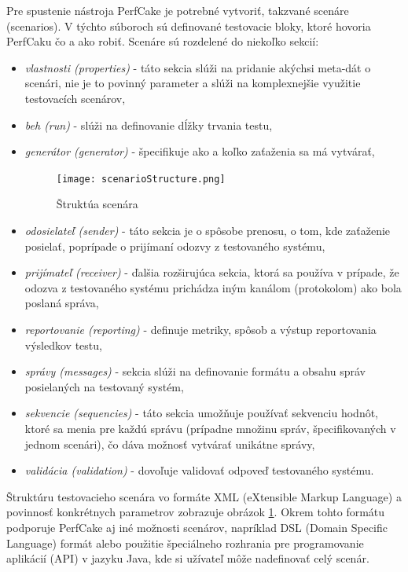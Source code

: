 Pre spustenie nástroja PerfCake je potrebné vytvoriť, takzvané scenáre (scenarios). V týchto súboroch sú definované testovacie bloky, ktoré hovoria PerfCaku čo a ako robiť. Scenáre sú rozdelené do niekoľko sekcií:
\begin{itemize}
\item \textit{vlastnosti (properties)} - táto sekcia slúži na pridanie akýchsi meta-dát o scenári, nie je to povinný parameter a slúži na komplexnejšie využitie testovacích scenárov,
\item \textit{beh (run)} - slúži na  definovanie dĺžky trvania testu,
\item \textit{generátor (generator)} - špecifikuje ako a koľko zaťaženia sa má vytvárať,
\begin{figure}[!ht]
\centering
\texttt{[image: scenarioStructure.png]} 
\caption{Štruktúa scenára}\label{scenarioStructure}
\end{figure}
\item \textit{odosielateľ (sender)} - táto sekcia je o spôsobe prenosu, o tom, kde zaťaženie posielať, poprípade o prijímaní odozvy z testovaného systému,
\item \textit{prijímateľ (receiver)} - ďalšia rozširujúca sekcia, ktorá sa používa v prípade, že odozva z testovaného systému prichádza iným kanálom (protokolom) ako bola poslaná správa,
\item \textit{reportovanie (reporting)} - definuje metriky, spôsob a výstup reportovania výsledkov testu,
\item \textit{správy (messages)} -  sekcia slúži na definovanie formátu a obsahu správ posielaných na testovaný systém,
\item \textit{sekvencie (sequencies)} - táto sekcia umožňuje používať sekvenciu hodnôt, ktoré sa menia pre každú správu (prípadne množinu správ, špecifikovaných v jednom scenári), čo dáva možnosť vytvárať unikátne správy,
\item \textit{validácia (validation)} - dovoľuje validovať odpoveď  testovaného systému.
\end{itemize}

Štruktúru testovacieho scenára vo formáte XML (eXtensible Markup Language) a povinnosť konkrétnych parametrov zobrazuje obrázok \ref{scenarioStructure}. Okrem tohto formátu podporuje PerfCake aj iné možnosti scenárov, napríklad DSL (Domain Specific Language) formát alebo použitie špeciálneho rozhrania pre programovanie aplikácií (API) v jazyku Java, kde si užívateľ môže nadefinovať celý scenár.


